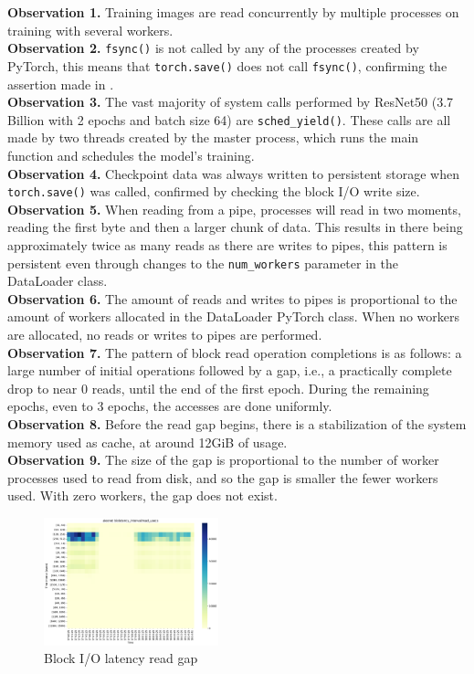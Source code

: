 \documentclass[conference]{IEEEtran}
\begin{document}
\hspace{-0.55cm} \textbf{Observation 1.} Training images are read concurrently by multiple processes on training with several workers.
\\
\textbf{Observation 2.} \texttt{fsync()} is not called by any of the processes created by PyTorch, this means that \texttt{torch.save()} does not call \texttt{fsync()}, confirming the assertion made in \cite{checkfreq}.
\\
\textbf{Observation 3.} The vast majority of system calls performed by ResNet50 (3.7 Billion with 2 epochs and batch size 64) are \texttt{sched\_yield()}. These calls are all made by two threads created by the master process, which runs the main function and schedules the model's training.
\\
\textbf{Observation 4.} Checkpoint data was always written to persistent storage when \texttt{torch.save()} was called, confirmed by checking the block I/O write size.
\\
\textbf{Observation 5.} When reading from a pipe, processes will read in two moments, reading the first byte and then a larger chunk of data. This results in there being approximately twice as many reads as there are writes to pipes, this pattern is persistent even through changes to the \texttt{num\_workers} parameter in the DataLoader class.
\\
\textbf{Observation 6.} The amount of reads and writes to pipes is proportional to the amount of workers allocated in the DataLoader PyTorch class. When no workers are allocated, no reads or writes to pipes are performed.
\\
\textbf{Observation 7.} The pattern of block read operation completions is as follows: a large number of initial operations followed by a gap, i.e., a practically complete drop to near 0 reads, until the end of the first epoch. During the remaining epochs, even to 3 epochs, the accesses are done uniformly.
\\
\textbf{Observation 8.} Before the read gap begins, there is a stabilization of the system memory used as cache, at around 12GiB of usage.
\\
\textbf{Observation 9.} The size of the gap is proportional to the number of worker processes used to read from disk, and so the gap is smaller the fewer workers used. With zero workers, the gap does not exist.
\begin{figure}[htbp]
	\centering
	\includegraphics[width=0.45\textwidth]{images/biolatency_gap.pdf}
	\caption{Block I/O latency read gap}
	\label{fig:biogap}
\end{figure}
\end{document}
